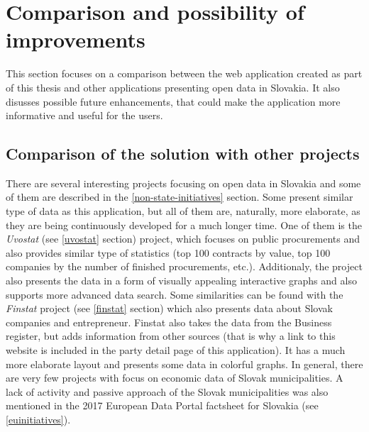 \documentclass[thesis=B,english]{FITthesis}[2012/06/26]
\begin{document}
{	\section{Comparison and possibility of improvements}
	This section focuses on a comparison between the web application created as part of this thesis and other applications presenting open data in Slovakia. It also disusses possible future enhancements, that could make the application more informative and useful for the users.
	\subsection{Comparison of the solution with other projects}
	There are several interesting projects focusing on open data in Slovakia and some of them are described in the \ref{non-state-initiatives} section. Some present similar type of data as this application, but all of them are, naturally, more elaborate, as they are being continuously developed for a much longer time. One of them is the \textit{Uvostat} (see \ref{uvostat} section) project, which focuses on public procurements and also provides similar type of statistics (top 100 contracts by value, top 100 companies by the number of finished procurements, etc.). Additionaly, the project also presents the data in a form of visually appealing interactive graphs and also supports more advanced data search. Some similarities can be found with the \textit{Finstat} project (see \ref{finstat} section) which also presents data about Slovak companies and entrepreneur. Finstat also takes the data from the Business register, but adds information from other sources (that is why a link to this website is included in the party detail page of this application). It has a much more elaborate layout and presents some data in colorful graphs. In general, there are very few projects with focus on economic data of Slovak municipalities. A lack of activity and passive approach of the Slovak municipalities was also mentioned in the 2017 European Data Portal factsheet for Slovakia (see \ref{euinitiatives}).
}
\end{document}
